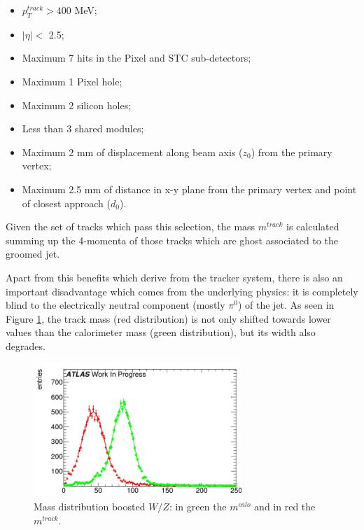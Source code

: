 \begin{itemize}
 \item $p_T^{track} > 400$ MeV;
 \item $|\eta|<$ 2.5;
 \item Maximum 7 hits in the Pixel and STC sub-detectors;
 \item Maximum 1 Pixel hole;
 \item Maximum 2 silicon holes;
 \item Less than 3 shared modules;
 \item Maximum 2 mm of displacement along beam axis ($z_0$) from the primary vertex;
 \item Maximum 2.5 mm of distance in x-y plane from the primary vertex and point of closest approach ($d_0$).
\end{itemize}

Given the set of tracks which pass this selection, the mass $m^{track}$ is calculated summing up the 4-momenta of those tracks which are ghost associated to the groomed jet.


Apart from this benefits which derive from the tracker system, there is also an important disadvantage which comes from the underlying physics: it is completely blind to the electrically neutral component (mostly $\pi^0$) of the jet. As seen in Figure \ref{fig:trackandcalo}, the track mass (red distribution) is not only shifted towards lower values than the calorimeter mass (green distribution), but its width also degrades. 

\begin{figure}[!ht]
  \centering
      \includegraphics[width=0.7\textwidth]{jet_part/trackandcalo.png}
  \caption[Mass distribution for boosted $W/Z$]{Mass distribution boosted $W/Z$: in green the $m^{calo}$ and in red the $m^{track}$. }
  \label{fig:trackandcalo}
\end{figure}

